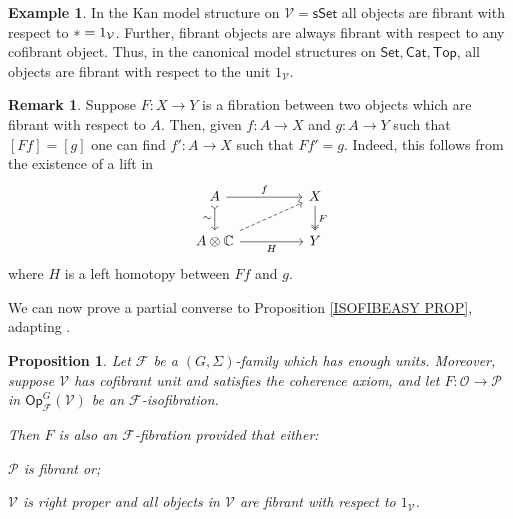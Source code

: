 \documentclass[a4paper,10pt
,draft
]{article}%
\numberwithin{equation}{section}
\numberwithin{figure}{section}
\newtheorem{proposition}[equation]{Proposition}%
\theoremstyle{definition} %
\newtheorem{example}[equation]{Example}%
\newtheorem{remark}[equation]{Remark}%
\newcommand{\Op}{\mathsf{Op}}%
\newcommand{\F}{\ensuremath{\mathcal F}}
\newcommand{\V}{\ensuremath{\mathcal V}}
\renewcommand{\O}{\ensuremath{\mathcal O}}
\renewcommand{\P}{\ensuremath{\mathcal P}}
\newcommand{\1}{\ensuremath{\mathbbm 1}}%
\begin{document}
\begin{example}
	In the Kan model structure on $\V=\mathsf{sSet}$   
	all objects are fibrant with respect to $\** = 1_{\V}$.
	Further, fibrant objects are always fibrant with respect to any cofibrant object.
	Thus, in the canonical model structures on 
	$\mathsf{Set}, \mathsf{Cat}, \mathsf{Top}$,
	all objects are fibrant with respect to the unit $1_{\V}$.
\end{example}


\begin{remark}\label{RELFIBLIFT REM}
	Suppose $F\colon X \to Y$ is a fibration between two objects
	which are fibrant with respect to $A$.
	Then, given 
	$f\colon A \to X$ and $g \colon A \to Y$
	such that
	$[Ff] = [g]$
	one can find 
	$f'\colon A \to X$ such that $Ff' =g$.
	Indeed, this follows from the existence of a 
	lift in 
	\begin{equation}
	\begin{tikzcd}[column sep = 45pt]
	A \ar[>->]{d}[swap]{\sim} \ar{r}{f}
	&
	X \ar[twoheadrightarrow]{d}{F}
	\\
	A \otimes \mathbb{C} \ar{r}[swap]{H} \ar[dashed]{ru}
	&
	Y
	\end{tikzcd}
	\end{equation}
	where $H$ is a left homotopy between $Ff$ and $g$.
\end{remark}


We can now prove a partial converse to Proposition \ref{ISOFIBEASY PROP}, 
adapting \cite[Prop. 2.5]{Ber07b}.


\begin{proposition}
	\label{ISOFIBHARD PROP}
	Let $\F$ be a $(G,\Sigma)$-family which has enough units.
	Moreover, suppose $\V$ has cofibrant unit
	and satisfies the coherence axiom,
	and let $F: \O \to \P$ in $\Op^G_\F(\V)$
	be an $\F$-isofibration.
	
	Then $F$ is also an $\F$-fibration
	provided that either:
	\begin{enumerate*}[label = (\roman*)]
		\item $\P$ is fibrant or;
		\item $\V$ is right proper and
		all objects in $\V$ are fibrant with respect to $1_{\V}$.
	\end{enumerate*}
\end{proposition}
\end{document}
